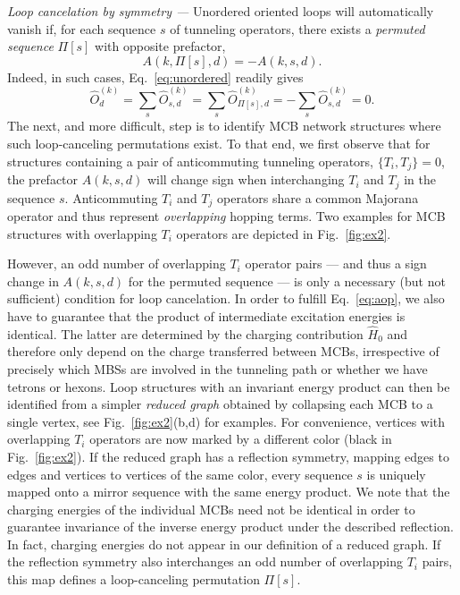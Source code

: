 \documentclass[twocolumn,floats,prx,showpacs]{revtex4-1}
\newcommand{\rein}[1]{{\color{rein} #1}}
\begin{document}
\emph{Loop cancelation by symmetry ---}
Unordered oriented loops will automatically vanish if, for each sequence $s$ of tunneling operators, there exists a \emph{permuted sequence} $\Pi[s]$ with opposite prefactor, 
\begin{equation}\label{eq:aop}
A(k, \Pi[s],d) = -A(k,s,d).
\end{equation}
Indeed, in such  cases, Eq.~\eqref{eq:unordered} readily gives  
\begin{equation}
\hat O^{(k)}_d=\sum_{s} \hat O^{(k)}_{s,d}  = 
\sum_{s} \hat O^{(k)}_{\Pi[s],d} = - \sum_{s} \hat O^{(k)}_{s,d} = 0.
\end{equation} 
The next, and more difficult, step is to identify MCB network structures where such loop-canceling permutations exist. To that end, we first observe that for structures containing a pair of anticommuting tunneling operators, $\{ T_i, T_j\}=0$, the prefactor $A(k,s,d)$ will change sign when interchanging $T_i$ and $T_j$ in the sequence $s$.   
Anticommuting $T_i$ and $T_j$ operators share a common Majorana operator and thus represent \emph{overlapping} hopping terms. Two examples for MCB structures with overlapping $T_i$ operators are depicted in Fig.~\ref{fig:ex2}. 

However, an odd number of overlapping $T_i$ operator pairs --- and thus a sign change in $A(k,s,d)$ for the 
permuted sequence --- is only a necessary (but not sufficient) condition for loop cancelation.  
In order to fulfill Eq.~\eqref{eq:aop}, we also have to guarantee that the product of intermediate excitation
energies is identical.  The latter are determined by the charging contribution $\hat H_0$
and therefore only depend on the charge transferred between MCBs, irrespective of precisely which 
MBSs are involved in the tunneling path or whether we have tetrons or hexons. 
Loop structures with an invariant energy product can then be identified 
from a simpler \emph{reduced graph} obtained by collapsing each MCB to a single vertex, 
see Fig.~\ref{fig:ex2}(b,d) for examples.
For convenience, vertices with overlapping $T_i$ operators are now marked by a different color (black in Fig.~\ref{fig:ex2}). If the reduced graph has a reflection symmetry, 
mapping edges to edges and vertices to vertices of the same color, 
every sequence $s$ is uniquely mapped onto a mirror sequence with the same energy product. \rein{We note that the charging energies of the individual MCBs need not be identical in order to guarantee invariance of the inverse energy product under the described reflection.  In fact, charging energies do not appear in our definition of a reduced graph.  }
If the reflection symmetry also interchanges an odd number of overlapping $T_i$ pairs,
this map defines a loop-canceling permutation $\Pi[s]$. 
\end{document}

